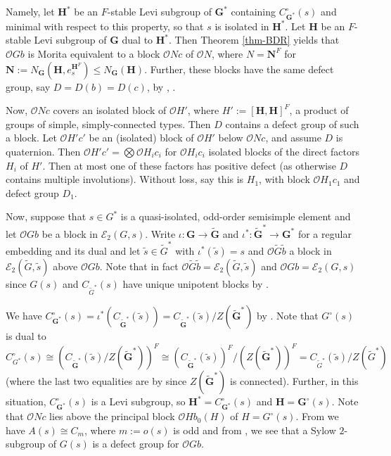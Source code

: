 \documentclass{amsart}
\theoremstyle{plain}\newtheorem{Theorem}{Theorem}[section]
\theoremstyle{plain}\newtheorem{Conjecture}[Theorem]{Conjecture}
\theoremstyle{plain}\newtheorem{Corollary}[Theorem]{Corollary}
\theoremstyle{plain}\newtheorem{Lemma}[Theorem]{Lemma}
\theoremstyle{plain}\newtheorem{Proposition}[Theorem]{Proposition}
\theoremstyle{definition}\newtheorem{Definition}[Theorem]{Definition}
\theoremstyle{definition}\newtheorem{Example}[Theorem]{Example}
\theoremstyle{definition}\newtheorem{Examples}[Theorem]{Examples}
\theoremstyle{definition}\newtheorem{Exercise}[Theorem]{Exercise}
\theoremstyle{definition}\newtheorem{Notation}[Theorem]{Notation}
\theoremstyle{definition}\newtheorem{Remark}[Theorem]{Remark}
\theoremstyle{definition}\newtheorem{Remarks}[Theorem]{Remarks}
\def\CO{{\mathcal{O}}}    \def\OPE{{\mathcal{O}(P\rtimes E)}}
\newcommand{\bG}{{\mathbf{G}}}
\newcommand{\bH}{{\mathbf{H}}}
\newcommand{\bN}{{\mathbf{N}}}
\newcommand{\wt}{\widetilde}
\newcommand{\cent} {C}
\newcommand{\zent} {Z}
\newcommand{\norm} {N}
\numberwithin{equation}{section}
\begin{document}
Namely, let $\bH^\ast$ be an $F$-stable Levi subgroup of $\bG^\ast$ containing $\cent_{\bG^\ast}^\circ(s)$ and minimal with respect to this property, so that $s$ is isolated in $\bH^\ast$. Let $\bH$ be an $F$-stable Levi subgroup of $\bG$ dual to $\bH^\ast$. 
Then Theorem \ref{thm-BDR}
yields that $\CO G b$ is Morita equivalent to a block $\CO N c$ of $\CO N$, where $N=\bN^F$ for $\bN:=\norm_{\bG}(\bH, e_{s}^{\bH^F})\leq \norm_{\bG}(\bH)$. 
Further, these blocks have the same defect group, say $D=D(b)=D(c)$, by \cite[Thm.~7.7]{BDR}, \cite[Thm.~2]{Ruh20}.

Now, $\CO N c$ covers an isolated block of $\CO H'$, where $H':=[\bH, \bH]^F$, a product of groups of simple, simply-connected types. Then $D$ contains a defect group of such a block. Let $\CO H' c'$ be an (isolated) block of $\CO H'$ below $\CO N c$, and assume $D$ is quaternion. Then $\CO H' c'=\bigotimes \CO H_i c_i$ for $\CO H_i c_i$ isolated blocks of the direct factors $H_i$ of $H'$. Then at most one of these factors has positive defect (as otherwise $D$ contains multiple involutions). Without loss, say this is $H_1$, with block $\CO H_1c_1$ and defect group $D_1$. 


Now, suppose that $s\in G^\ast$ is a quasi-isolated, odd-order semisimple element and let $\CO G b$ be  a block in $\mathcal{E}_2(G,s)$.  Write $\iota\colon \bG\rightarrow \wt\bG$ and $\iota^\ast\colon \wt\bG^\ast\rightarrow \bG^\ast$ for a regular embedding and its dual and let $\wt{s}\in\wt{G}^\ast$ with $\iota^\ast(\wt{s})=s$ and $\CO\wt{G}\wt{b}$  a block in $\mathcal{E}_2(\wt{G},\wt{s})$  above $\CO G b$. Note that in fact $\CO\wt G\wt{b}=\mathcal{E}_2(\wt{G},\wt{s})$ and $\CO G b=\mathcal{E}_2(G,s)$ since $G(s)$ and $\cent_{\wt{G}^\ast}(s)$ have unique unipotent blocks by \cite[Thm.~21.14]{CaEnbook}.  

We have $\cent_{\bG^\ast}^\circ(s)=\iota^\ast(\cent_{\wt\bG^\ast}(\wt{s}))=\cent_{\wt\bG^\ast}(\wt{s})/\zent(\wt\bG^\ast)$ by \cite[(2.2)]{bon}. Note that $G^\circ(s)$ is dual to $\cent_{ G^\ast}^\circ(s) \cong (\cent_{\wt\bG^\ast}(\wt{s})/\zent(\wt\bG^\ast))^F\cong (\cent_{\wt\bG^\ast}(\wt{s}))^F/(\zent(\wt\bG^\ast))^F=\cent_{\wt{G}^\ast}(\wt{s})/\zent(\wt{G}^\ast)$ (where the last two equalities are by \cite[Ex.~1.4.11]{GM20} since $\zent(\wt\bG^\ast)$ is connected). 
Further, in this situation,  $\cent_{\bG^\ast}^\circ(s)$ is a Levi subgroup, so $\bH^\ast=\cent_{\bG^\ast}^\circ(s)$ and $\bH=\bG^\circ(s)$. Note that $\CO N c$ lies above the principal block $\CO H b_0(H)$ of $H=G^\circ(s)$.
From \cite[Prop.~5.2]{bon} we have $A(s)\cong C_m$, where $m:=o(s)$ is odd and from \cite[Prop.~6.1]{Ruh25}, we see that a Sylow $2$-subgroup of $G(s)$ is a defect group for $\CO G b$. 
\end{document}
